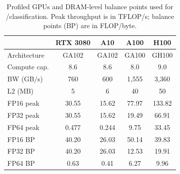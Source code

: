 \begin{table}[t]
  \centering
  \caption{Profiled GPUs and DRAM-level balance points used for \bandwidthbound/\computebound classification.
  Peak throughput is in TFLOP/s; balance points (BP) are in FLOP/byte.}
  \label{tab:gpu-specs}
  \scriptsize
  \setlength{\tabcolsep}{3pt}
  \begin{tabular}{lcccc}
    & RTX 3080 & A10 & A100 & H100 \\
    \midrule
    Architecture & GA102 & GA102 & GA100 & GH100 \\
    Compute cap. & 8.6 & 8.6 & 8.0 & 9.0 \\
    BW (GB/s) & 760 & 600 & 1{,}555 & 3{,}360 \\
    L2 (MB) & 5 & 6 & 40 & 50 \\
    FP16 peak & 30.55 & 15.62 & 77.97 & 133.82 \\
    FP32 peak & 30.55 & 15.62 & 19.49 & 66.91 \\
    FP64 peak & 0.477 & 0.244 & 9.75 & 33.45 \\
    \midrule
    FP16 BP & 40.20 & 26.03 & 50.14 & 39.83 \\
    FP32 BP & 40.20 & 26.03 & 12.53 & 19.91 \\
    FP64 BP & 0.63 & 0.41 & 6.27 & 9.96 \\
  \end{tabular}
\end{table}
